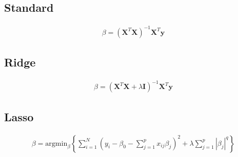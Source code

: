 \subsection{Standard}


\begin{align*}
    \beta = \left(
    \textbf{X}^T\textbf{X}
    \right)^{-1}
    \textbf{X}^T\textbf{y}
\end{align*}

\subsection{Ridge}

\begin{align*}
    \beta = \left(
    \textbf{X}^T\textbf{X}
     + \lambda \textbf{I}
     \right)^{-1}
    \textbf{X}^T\textbf{y}
\end{align*}

\subsection{Lasso}

\begin{align*}
    \beta = \text{argmin}_{\beta}
    \left\{
    \sum^N_{i=1}
    \left(
    y_i - \beta_0 -
    \sum_{j=1}^p x_{ij}\beta_j
    \right)^2
    + \lambda
    \sum^p_{j=1}|\beta_j|^q
    \right\}
\end{align*}
